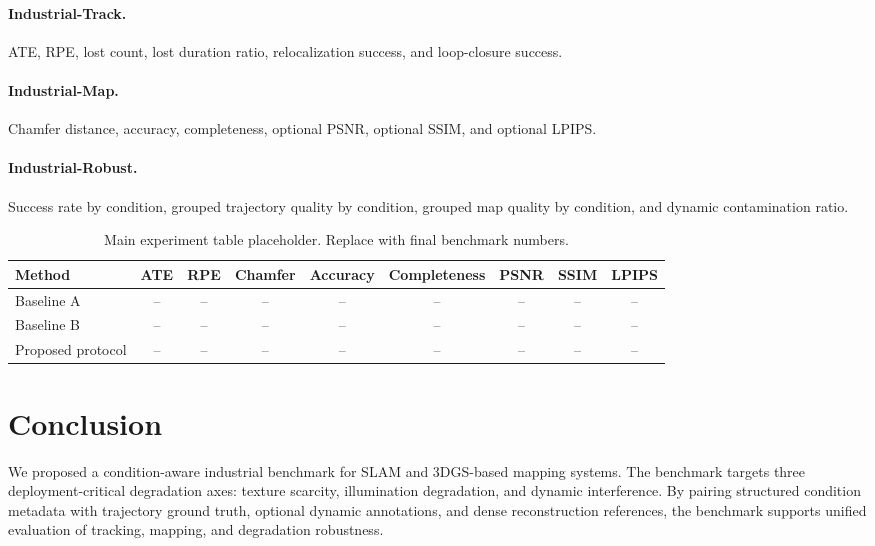 \documentclass[10pt,twocolumn]{article}
\begin{document}
\paragraph{Industrial-Track.}
ATE, RPE, lost count, lost duration ratio, relocalization success, and loop-closure success.

\paragraph{Industrial-Map.}
Chamfer distance, accuracy, completeness, optional PSNR, optional SSIM, and optional LPIPS.

\paragraph{Industrial-Robust.}
Success rate by condition, grouped trajectory quality by condition, grouped map quality by condition, and dynamic contamination ratio.

\begin{table}[t]
    \centering
    \caption{Main experiment table placeholder. Replace with final benchmark numbers.}
    \begin{tabular}{lcccccccc}
        \toprule
        Method & ATE & RPE & Chamfer & Accuracy & Completeness & PSNR & SSIM & LPIPS \\
        \midrule
        Baseline A & -- & -- & -- & -- & -- & -- & -- & -- \\
        Baseline B & -- & -- & -- & -- & -- & -- & -- & -- \\
        Proposed protocol & -- & -- & -- & -- & -- & -- & -- & -- \\
        \bottomrule
    \end{tabular}
    \label{tab:main_results}
\end{table}

\section{Conclusion}

We proposed a condition-aware industrial benchmark for SLAM and 3DGS-based mapping systems. The benchmark targets three deployment-critical degradation axes: texture scarcity, illumination degradation, and dynamic interference. By pairing structured condition metadata with trajectory ground truth, optional dynamic annotations, and dense reconstruction references, the benchmark supports unified evaluation of tracking, mapping, and degradation robustness.



\end{document}
